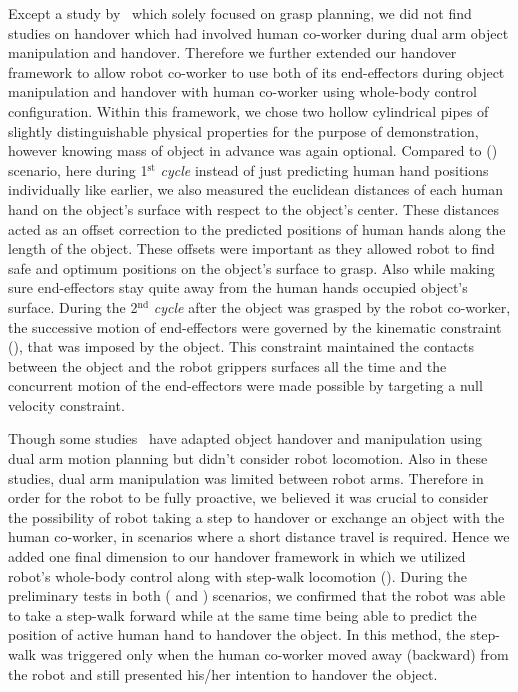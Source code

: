  
Except a study by~\cite{kim2004advanced} which solely focused on grasp planning, we did not find studies on handover which had involved human co-worker during dual arm object manipulation and handover. Therefore we further extended our handover framework to allow robot co-worker to use both of its end-effectors during object manipulation and handover with human co-worker using whole-body control configuration. Within this framework, we chose two hollow cylindrical pipes of slightly distinguishable physical properties for the purpose of demonstration, however knowing mass of object in advance was again optional. Compared to () scenario, here during 1$ {}^\text{st} $ \textit{cycle} instead of just predicting human hand positions individually like earlier, we also measured the euclidean distances of each human hand on the object's surface with respect to the object's center. These distances acted as an offset correction to the predicted positions of human hands along the length of the object. These offsets were important as they allowed robot to find safe and optimum positions on the object's surface to grasp. Also while making sure end-effectors stay quite away from the human hands occupied object's surface. During the 2$ {}^\text{nd} $ \textit{cycle} after the object was grasped by the robot co-worker, the successive motion of end-effectors were governed by the kinematic constraint (), that was imposed by the object. This constraint maintained the contacts between the object and the robot grippers surfaces all the time and the concurrent motion of the end-effectors were made possible by targeting a null velocity constraint.


Though some studies~\cite{vahrenkamp2009humanoid, vezzani2017novel} have adapted object handover and manipulation using dual arm motion planning but didn't consider robot locomotion. Also in these studies, dual arm manipulation was limited between robot arms. Therefore in order for the robot to be fully proactive, we believed it was crucial to consider the possibility of robot taking a step to handover or exchange an object with the human co-worker, in scenarios where a short distance travel is required. Hence we added one final dimension to our handover framework in which we utilized robot's whole-body control along with step-walk locomotion (). During the preliminary tests in both ( and ) scenarios, we confirmed that the robot was able to take a step-walk forward while at the same time being able to predict the position of active human hand to handover the object. In this method, the step-walk was triggered only when the human co-worker moved away (backward) from the robot and still presented his/her intention to handover the object.



